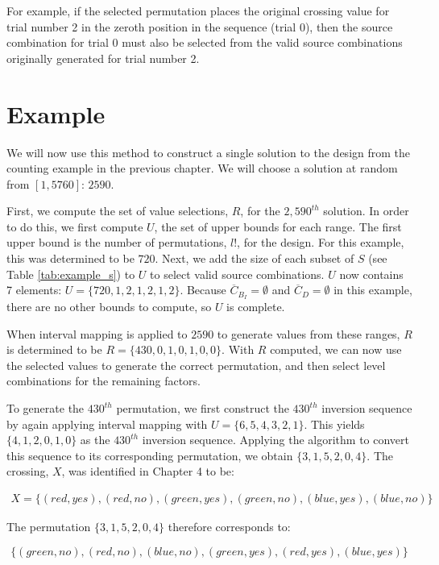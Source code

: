 For example, if the selected permutation places the original crossing value for trial number 2 in the zeroth position in the sequence (trial 0), then the source combination for trial 0 must also be selected from the valid source combinations originally generated for trial number 2.


\section{Example}

We will now use this method to construct a single solution to the design from the counting example in the previous chapter. We will choose a solution at random from $[1, 5760]$: $2590$.

First, we compute the set of value selections, $R$, for the $2,590^{th}$ solution. In order to do this, we first compute $U$, the set of upper bounds for each range. The first upper bound is the number of permutations, $l!$, for the design. For this example, this was determined to be $720$. Next, we add the size of each subset of $S$ (see Table \ref{tab:example_s}) to $U$ to select valid source combinations. $U$ now contains 7 elements: $U = \{720, 1, 2, 1, 2, 1, 2\}$. Because $\overline{C}_{B_I} = \emptyset$ and $\overline{C}_D = \emptyset$ in this example, there are no other bounds to compute, so $U$ is complete.

When interval mapping is applied to $2590$ to generate values from these ranges, $R$ is determined to be $R = \{430, 0, 1, 0, 1, 0, 0\}$. With $R$ computed, we can now use the selected values to generate the correct permutation, and then select level combinations for the remaining factors.

To generate the $430^{th}$ permutation, we first construct the $430^{th}$ inversion sequence by again applying interval mapping with $U = \{6, 5, 4, 3, 2, 1\}$. This yields $\{4, 1, 2, 0, 1, 0\}$ as the $430^{th}$ inversion sequence. Applying the algorithm to convert this sequence to its corresponding permutation, we obtain $\{3, 1, 5, 2, 0, 4\}$. The crossing, $X$, was identified in Chapter 4 to be:

\begin{align*}
X = \{(red, yes), (red, no), (green, yes), (green, no), (blue, yes), (blue, no)\}
\end{align*}

The permutation $\{3, 1, 5, 2, 0, 4\}$ therefore corresponds to:

\[
    \{(green, no), (red, no), (blue, no), (green, yes), (red, yes), (blue, yes)\}
\]


